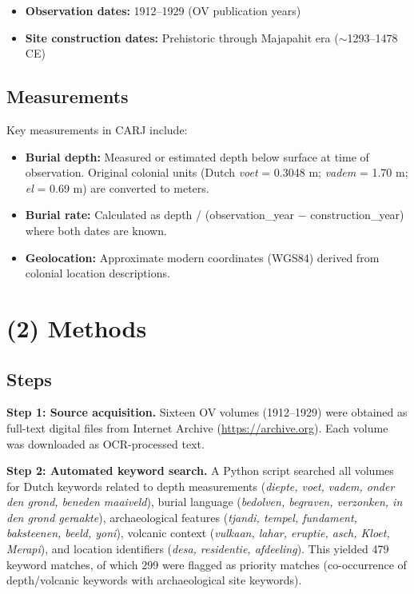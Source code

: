 \documentclass[11pt]{article}
\begin{document}
\begin{itemize}
    \item \textbf{Observation dates:} 1912--1929 (OV publication years)
    \item \textbf{Site construction dates:} Prehistoric through Majapahit era ($\sim$1293--1478 CE)
\end{itemize}

\subsection{Measurements}

Key measurements in CARJ include:
\begin{itemize}
    \item \textbf{Burial depth:} Measured or estimated depth below surface at time of observation. Original colonial units (Dutch \textit{voet} = 0.3048 m; \textit{vadem} = 1.70 m; \textit{el} = 0.69 m) are converted to meters.
    \item \textbf{Burial rate:} Calculated as depth / (observation\_year $-$ construction\_year) where both dates are known.
    \item \textbf{Geolocation:} Approximate modern coordinates (WGS84) derived from colonial location descriptions.
\end{itemize}

\section{(2) Methods}

\subsection{Steps}

\textbf{Step 1: Source acquisition.} Sixteen OV volumes (1912--1929) were obtained as full-text digital files from Internet Archive (\url{https://archive.org}). Each volume was downloaded as OCR-processed text.

\textbf{Step 2: Automated keyword search.} A Python script searched all volumes for Dutch keywords related to depth measurements (\textit{diepte, voet, vadem, onder den grond, beneden maaiveld}), burial language (\textit{bedolven, begraven, verzonken, in den grond geraakte}), archaeological features (\textit{tjandi, tempel, fundament, baksteenen, beeld, yoni}), volcanic context (\textit{vulkaan, lahar, eruptie, asch, Kloet, Merapi}), and location identifiers (\textit{desa, residentie, afdeeling}). This yielded 479 keyword matches, of which 299 were flagged as priority matches (co-occurrence of depth/volcanic keywords with archaeological site keywords).
\end{document}

